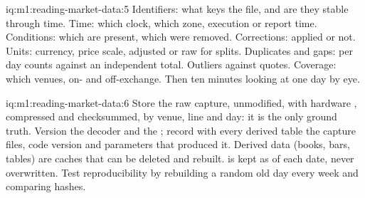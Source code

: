 \begin{solution}{iq:m1:reading-market-data:5}
Identifiers: what keys the file, and are they stable through time. Time:
which clock, which zone, execution or report time. Conditions: which are
present, which were removed. Corrections: applied or not. Units: currency,
price scale, adjusted or raw for splits. Duplicates and gaps: per day counts
against an independent total. Outliers against quotes. Coverage: which
venues, on- and off-exchange. Then ten minutes looking at one day by eye.
\end{solution}

\begin{solution}{iq:m1:reading-market-data:6}
Store the raw capture, unmodified, with hardware ,
compressed and checksummed, by venue, line and day: it is the only ground
truth. Version the decoder and the ; record with every derived
table the capture files, code version and parameters that produced it.
Derived data (books, bars, tables) are caches that can be deleted and
rebuilt.  is kept as of each date, never overwritten. Test
reproducibility by rebuilding a random old day every week and comparing
hashes.
\end{solution}
